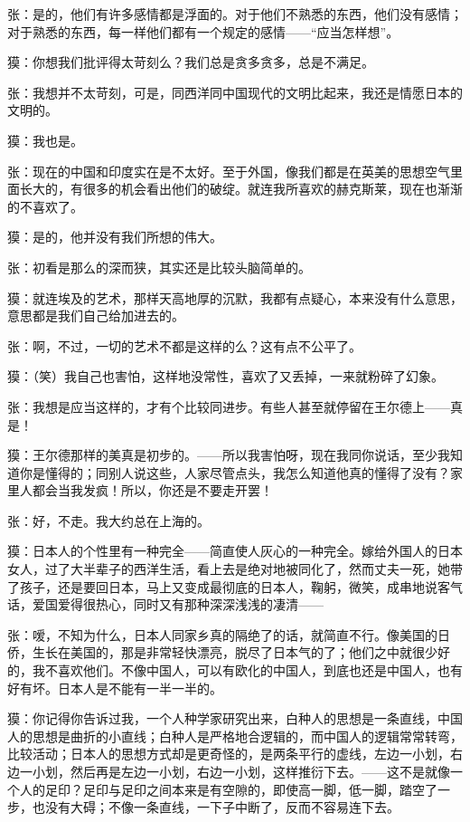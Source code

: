 \par 张：是的，他们有许多感情都是浮面的。对于他们不熟悉的东西，他们没有感情；对于熟悉的东西，每一样他们都有一个规定的感情——“应当怎样想”。
\par 獏：你想我们批评得太苛刻么？我们总是贪多贪多，总是不满足。
\par 张：我想并不太苛刻，可是，同西洋同中国现代的文明比起来，我还是情愿日本的文明的。
\par 獏：我也是。
\par 张：现在的中国和印度实在是不太好。至于外国，像我们都是在英美的思想空气里面长大的，有很多的机会看出他们的破绽。就连我所喜欢的赫克斯莱，现在也渐渐的不喜欢了。
\par 獏：是的，他并没有我们所想的伟大。
\par 张：初看是那么的深而狭，其实还是比较头脑简单的。
\par 獏：就连埃及的艺术，那样天高地厚的沉默，我都有点疑心，本来没有什么意思，意思都是我们自己给加进去的。
\par 张：啊，不过，一切的艺术不都是这样的么？这有点不公平了。
\par 獏：（笑）我自己也害怕，这样地没常性，喜欢了又丢掉，一来就粉碎了幻象。
\par 张：我想是应当这样的，才有个比较同进步。有些人甚至就停留在王尔德上——真是！
\par 獏：王尔德那样的美真是初步的。——所以我害怕呀，现在我同你说话，至少我知道你是懂得的；同别人说这些，人家尽管点头，我怎么知道他真的懂得了没有？家里人都会当我发疯！所以，你还是不要走开罢！
\par 张：好，不走。我大约总在上海的。
\par 獏：日本人的个性里有一种完全——简直使人灰心的一种完全。嫁给外国人的日本女人，过了大半辈子的西洋生活，看上去是绝对地被同化了，然而丈夫一死，她带了孩子，还是要回日本，马上又变成最彻底的日本人，鞠躬，微笑，成串地说客气话，爱国爱得很热心，同时又有那种深深浅浅的凄清——
\par 张：嗳，不知为什么，日本人同家乡真的隔绝了的话，就简直不行。像美国的日侨，生长在美国的，那是非常轻快漂亮，脱尽了日本气的了；他们之中就很少好的，我不喜欢他们。不像中国人，可以有欧化的中国人，到底也还是中国人，也有好有坏。日本人是不能有一半一半的。
\par 獏：你记得你告诉过我，一个人种学家研究出来，白种人的思想是一条直线，中国人的思想是曲折的小直线；白种人是严格地合逻辑的，而中国人的逻辑常常转弯，比较活动；日本人的思想方式却是更奇怪的，是两条平行的虚线，左边一小划，右边一小划，然后再是左边一小划，右边一小划，这样推衍下去。——这不是就像一个人的足印？足印与足印之间本来是有空隙的，即使高一脚，低一脚，踏空了一步，也没有大碍；不像一条直线，一下子中断了，反而不容易连下去。
